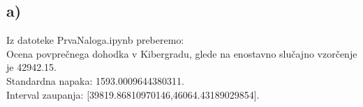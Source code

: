 \documentclass{article}
\begin{document}
\subsection*{a)}
%
%
%
%
Iz datoteke PrvaNaloga.ipynb preberemo:\\
Ocena povprečnega dohodka v Kibergradu, glede na enostavno slučajno vzorčenje je 42942.15.\\
Standardna napaka: 1593.0009644380311.\\
Interval zaupanja: [39819.86810970146,46064.43189029854].
\end{document}
